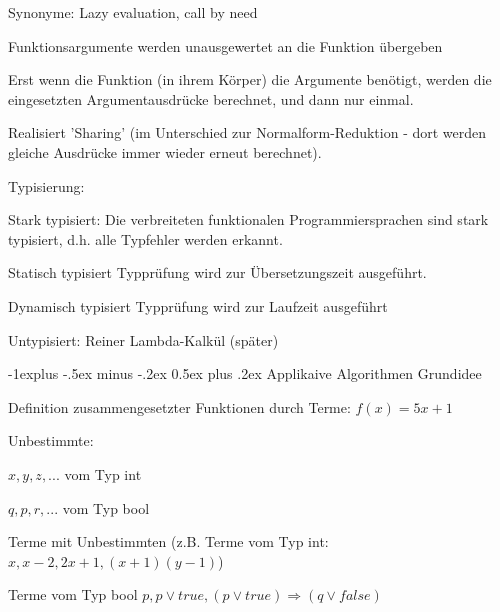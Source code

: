 \documentclass[10pt]{article}
\makeatletter
\renewcommand{\subsection}{\@startsection{subsection}{2}{0mm}%
                                {-1explus -.5ex minus -.2ex}%
                                {0.5ex plus .2ex}%
                                {\normalfont\normalsize\bfseries}}
\makeatother
\begin{document}
\begin{itemize*}
\begin{itemize*}
\begin{itemize*}
      \item Synonyme: Lazy evaluation, call by need
      \item Funktionsargumente werden unausgewertet an die Funktion übergeben
      \item Erst wenn die Funktion (in ihrem Körper) die Argumente benötigt, werden die eingesetzten Argumentausdrücke berechnet, und dann nur einmal.
      \item Realisiert 'Sharing' (im Unterschied zur Normalform-Reduktion - dort werden gleiche Ausdrücke immer wieder erneut berechnet).
    \end{itemize*}
  \end{itemize*}
  \item Typisierung:
  \begin{itemize*}
    \item Stark typisiert: Die verbreiteten funktionalen Programmiersprachen sind stark typisiert, d.h. alle Typfehler werden erkannt.
    \begin{description*}
      \item[Statisch typisiert] Typprüfung wird zur Übersetzungszeit ausgeführt.
      \item[Dynamisch typisiert] Typprüfung wird zur Laufzeit ausgeführt
    \end{description*}
    \item Untypisiert: Reiner Lambda-Kalkül (später)
  \end{itemize*}
\end{itemize*}

\subsection{Applikaive Algorithmen}
Grundidee
\begin{itemize*}
  \item Definition zusammengesetzter Funktionen durch Terme: $f(x) = 5x + 1$
  \item Unbestimmte:
  \begin{itemize*}
    \item $x, y, z, . . .$ vom Typ int
    \item $q, p, r , . . .$ vom Typ bool
  \end{itemize*}
  \item Terme mit Unbestimmten (z.B. Terme vom Typ int: $x, x - 2, 2x + 1, (x + 1)(y - 1)$)
  \item Terme vom Typ bool $p, p \vee true, (p \vee true) \Rightarrow (q \vee false)$
\end{itemize*}
\end{document}
